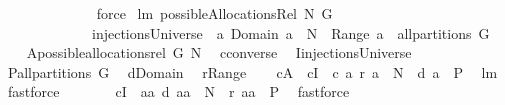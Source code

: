 \begin{isabellebody}
%
\isadelimproof
\ \ \ \ \ \ \ \ \ \ \ \ %
\endisadelimproof
%
\isatagproof
{}\isamarkupfalse%
\ force%
\endisatagproof
{\isafoldproof}%
%
\isadelimproof
\isanewline
%
\endisadelimproof
\isanewline
{}\isamarkupfalse%
\ lm{}{}{\isacharcolon}\ {\isachardoublequoteopen}possibleAllocationsRel\ N\ G\ {\isacharequal}\ \isanewline
\ \ \ \ \ \ \ \ \ \ \ \ \ injectionsUniverse\ {\isasyminter}\ {\isacharbraceleft}a{\isachardot}\ Domain\ a\ {\isasymsubseteq}\ N\ {\isacharampersand}\ Range\ a\ {\isasymin}\ all{\isacharunderscore}partitions\ G{\isacharbraceright}{\isachardoublequoteclose}\isanewline
%
\isadelimproof
%
\endisadelimproof
%
\isatagproof
{}\isamarkupfalse%
\ {\isacharminus}\isanewline
\ \ \isamarkupfalse%
\ {\isacharquery}A{\isacharequal}{\isachardoublequoteopen}possible{\isacharunderscore}allocations{\isacharunderscore}rel\ G\ N{\isachardoublequoteclose}\ \isamarkupfalse%
\ {\isacharquery}c{\isacharequal}converse\ \isamarkupfalse%
\ {\isacharquery}I{\isacharequal}injectionsUniverse\ \isanewline
\ \ \isamarkupfalse%
\ {\isacharquery}P{\isacharequal}{\isachardoublequoteopen}all{\isacharunderscore}partitions\ G{\isachardoublequoteclose}\ \isamarkupfalse%
\ {\isacharquery}d{\isacharequal}Domain\ \isamarkupfalse%
\ {\isacharquery}r{\isacharequal}Range\isanewline
\ \ \isamarkupfalse%
\ {\isachardoublequoteopen}{\isacharquery}c{\isacharbackquote}{\isacharquery}A\ {\isacharequal}\ {\isacharparenleft}{\isacharquery}c{\isacharbackquote}{\isacharquery}I{\isacharparenright}\ {\isasyminter}\ {\isacharquery}c{\isacharbackquote}\ {\isacharparenleft}{\isacharbraceleft}a{\isachardot}\ {\isacharquery}r\ a\ {\isasymsubseteq}\ N\ {\isacharampersand}\ {\isacharquery}d\ a\ {\isasymin}\ {\isacharquery}P{\isacharbraceright}{\isacharparenright}{\isachardoublequoteclose}\ \isamarkupfalse%
\ lm{}{}\ \isamarkupfalse%
\ fastforce\isanewline
\ \ \isamarkupfalse%
\ \isamarkupfalse%
\ {\isachardoublequoteopen}{\isachardot}{\isachardot}{\isachardot}\ {\isacharequal}\ {\isacharparenleft}{\isacharquery}c{\isacharbackquote}{\isacharquery}I{\isacharparenright}\ {\isasyminter}\ {\isacharbraceleft}aa{\isachardot}\ {\isacharquery}d\ aa\ {\isasymsubseteq}\ N\ {\isacharampersand}\ {\isacharquery}r\ aa\ {\isasymin}\ {\isacharquery}P{\isacharbraceright}{\isachardoublequoteclose}\ \isamarkupfalse%
\ fastforce\isanewline

\end{isabellebody}
